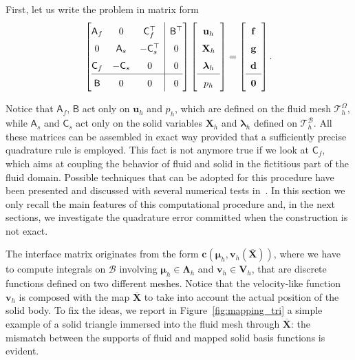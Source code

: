 \documentclass[oneside]{amsart} %
\newcommand\B{\mathcal B} %
\renewcommand\u{\mathbf{u}} %
\renewcommand\v{\mathbf{v}} %
\renewcommand\d{\mathbf{d}} %
\renewcommand\c{\mathbf{c}} %
\newcommand\f{\mathbf{f}} %
\newcommand\g{\mathbf{g}} %
\newcommand\X{\mathbf{X}} %
\newcommand\Xbar{\overline{\X}} %
\newcommand\LL{{\boldsymbol{\Lambda}}} %
\newcommand\Vline{\mathbf{V}} %
\newcommand\llambda{\boldsymbol\lambda} %
\newcommand\mmu{{\boldsymbol\mu}} %
\newcommand\T{\mathcal{T}} %
\newcommand{\Amatr}{\mathsf{A}}
\newcommand{\Bmatr}{\mathsf{B}}
\newcommand{\Cmatr}{\mathsf{C}}
\begin{document}
	First, let us write the problem in matrix form
	\begin{equation}\renewcommand{\arraystretch}{1.5}
		\label{eq:matrix}
		\left[\begin{array}{@{}ccc|c@{}}%
			\Amatr_f & 0 & \Cmatr_f^\top & \Bmatr^\top\\ 
			0  & \Amatr_s & -\Cmatr_s^\top &0 \\
			\Cmatr_f &  -\Cmatr_s & 0 & 0\\
			\hline
			\Bmatr & 0 & 0 & 0 \\
		\end{array}\right]
		\left[ \begin{array}{c}
			\u_h\\
			\X_h\\
			\llambda_h\\
			\hline
			p_h\\
		\end{array}\right]=
		\left[ \begin{array}{c}
			\f\\
			\g\\
			\d\\
			\hline
			\mathbf{0}
		\end{array}\right].
	\end{equation}\renewcommand{\arraystretch}{1.15}
	
	Notice that $\Amatr_f$, $\Bmatr$ act only on $\u_h$ and $p_h$, which
	are defined on the fluid mesh $\T^\Omega_h$, while $\Amatr_s$ and $\Cmatr_s$ act only on the solid variables $\X_h$ and $\llambda_h$ defined on $\T^\B_h$. All these matrices can be assembled in exact way provided that a sufficiently precise quadrature rule is employed. This fact is not anymore true if we look at $\Cmatr_f$, which aims at coupling the behavior of fluid and solid in the fictitious part of the fluid domain.
	Possible techniques that can be adopted for this procedure have been
	presented and discussed with several numerical tests
	in~\cite{boffi2022interface}. In this section we only recall the main features
	of this computational procedure and, in the next sections, we investigate the
	quadrature error committed when the construction is not exact.
	
	The interface matrix originates from the form
	$\c(\mmu_h,\v_h(\Xbar))$, where we have to compute integrals on $\B$ involving $\mmu_h\in\LL_h$ and $\v_h\in\Vline_h$, that are discrete functions defined on two different meshes. Notice that the velocity-like function $\v_h$ is composed with the map $\Xbar$ to take into account the actual position of the solid body. To fix the ideas, we report in Figure~\ref{fig:mapping_tri} a simple example of a solid triangle immersed into the fluid mesh through $\Xbar$: the mismatch between the supports of fluid and mapped solid basis functions is evident.
	
\end{document}

